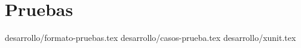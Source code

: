 \section {Pruebas}

 {desarrollo/formato-pruebas.tex}
 {desarrollo/casos-prueba.tex}
 {desarrollo/xunit.tex}